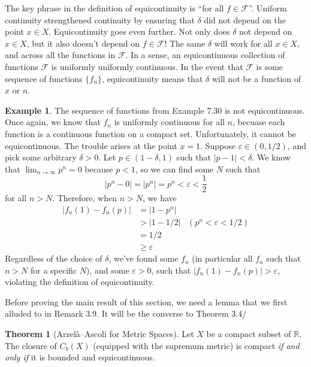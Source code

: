 \documentclass{article}
\newcommand{\R}{\mathbb{R}}
\newcommand{\abs}[1]{\left\lvert#1\right\rvert}
\theoremstyle{definition}
\newtheorem{theorem}{Theorem}[section]
\newtheorem{example}{Example}[section]
\begin{document}
	The key phrase in the definition of equicontinuity is ``for all $f\in\mathcal F$''. Uniform continuity strengthened continuity by ensuring that $\delta$ did not depend on the point $x\in X$. Equicontinuity goes even further. Not only does $\delta$ not depend on $x\in X$, but it also doesn't depend on $f\in\mathcal F$! The same $\delta$ will work for all $x\in X$, and across all the functions in $\mathcal F$. In a sense, an equicontinuous collection of functions $\mathcal F$ is uniformly uniformly continuous. In the event that $\mathcal F$ is some sequence of functions $\{f_n\}$, equicontinuity means that $\delta$ will not be a function of $x$ or $n$.
	
	\begin{example}
		The sequence of functions from Example 7.30 is not equicontinuous. Once again, we know that $f_n$ is uniformly continuous for all $n$, becuase each function is a continuous function on a compact set. Unfortunately, it cannot be equicontinuous. The trouble arises at the point $x = 1$. Suppose $\varepsilon \in (0,1/2)$, and pick some arbitrary $\delta > 0$. Let $p\in(1-\delta, 1)$ such that $|p - 1| < \delta$. We know that $\lim_{n\to\infty}p^n = 0$ because $p < 1$, so we can find some $N$ such that 
		$$\abs{p^n - 0} = \abs{p^n} = p^n < \varepsilon < \frac{1}{2} $$ for all $n>N$. Therefore, when $n > N$, we have 
		\begin{align*}
			\abs{f_n(1)-f_n(p)} &= \abs{1 - p^n} \\
											& > \abs{1 - 1/2}  & ( p^n < \varepsilon < 1/2)\\
											& = 1/2\\
											& \ge \varepsilon
		\end{align*}
	Regardless of the choice of $\delta$, we've found some $f_n$ (in particular all $f_n$ such that $n > N$ for a specific $N$), and some $\varepsilon > 0$, such that $ \abs{f_n(1)-f_n(p)} > \varepsilon$, violating the definition of equicontinuity.
	\end{example}

	Before proving the main result of this section, we need a lemma that we first alluded to in Remark 3.9. It will be the converse to Theorem 3.4/
	
	
	\begin{theorem}[Arzelà–Ascoli for Metric Spaces]
		Let $X$ be a compact subset of $\R$. The closure of $C_b(X)$ (equipped with the supremum metric) is compact \textit{if and only if} it is bounded and equicontinuous. 
	\end{theorem}
	
\end{document}
